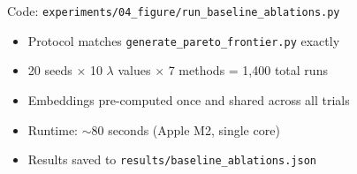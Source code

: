 Code: \texttt{experiments/04\_figure/run\_baseline\_ablations.py}

\begin{itemize}[noitemsep]
    \item Protocol matches \texttt{generate\_pareto\_frontier.py} exactly
    \item 20 seeds $\times$ 10 $\lambda$ values $\times$ 7 methods = 1,400 total runs
    \item Embeddings pre-computed once and shared across all trials
    \item Runtime: ${\sim}80$ seconds (Apple M2, single core)
    \item Results saved to \texttt{results/baseline\_ablations.json}
\end{itemize}
